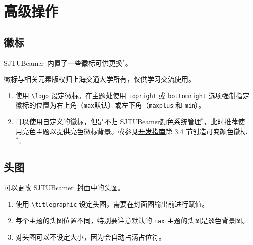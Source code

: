 \documentclass[
    UTF8,
    heading=true,
    12pt,
    a4paper
]{ctexrep}
\newenvironment{commentlist}{\begin{enumerate}\small}{\end{enumerate}}
\def\themename{\textsf{SJTUBeamer}}
\begin{document}
\part{高级操作}
\chapter{徽标}

\themename\ 内置了一些徽标可供更换$^*$。

\faInfoCircle 徽标与相关元素版权归上海交通大学所有，仅供学习交流使用。

\begin{tcbitemize}[raster rows=2, raster columns=3, raster every box/.style={center title, valign=center, halign=center,fonttitle=\ttfamily,colback=white}]
  \tcbitem[raster multicolumn=2,blankest]
  \begin{tcbitemize}[raster columns=2]
    \tcbitem[title={\textbackslash{}cnlogo}] \moveleft 0.3cm\hbox{\resizebox{!}{1cm}{\cnlogo}}
    \tcbitem[title={\textbackslash{}enlogo}] \moveleft 0.3cm\hbox{\resizebox{!}{1cm}{\enlogo}}
    \tcbitem[title={\textbackslash{}sjtubadge},height=3.5cm] \resizebox{!}{2cm}{\sjtubadge\ }
    \tcbitem[title={\textbackslash{}dlogo},height=3.5cm] \resizebox{3cm}{!}{\dlogo\ }
  \end{tcbitemize}
  \tcbitem[title={\textbackslash{}vlogo}] \resizebox{!}{4.8cm}{\vlogo\ }
\end{tcbitemize}


\begin{commentlist}
  \item 使用 \texttt{\textbackslash{}logo} 设定徽标。在主题处使用 \verb"topright" 或 \verb"bottomright" 选项强制指定徽标的位置为右上角（\verb"max"默认）或左下角（\verb"maxplus" 和 \verb"min"）。
  \item 可以使用自定义的徽标，但是不归 \themename 颜色系统管理$^*$，此时推荐使用亮色主题以提供亮色徽标背景。或参见\href{run:sjtubeamerdevguide.pdf}{开发指南}第 3.4 节创造可变颜色徽标$^*$。
\end{commentlist}

\chapter{头图}

可以更改 \themename\ 封面中的头图。


\begin{commentlist}
  \item 使用 \texttt{\textbackslash{}titlegraphic} 设定头图，需要在封面图输出前进行赋值。
  \item 每个主题的头图位置不同，特别要注意默认的 \texttt{max} 主题的头图是淡色背景图。
  \item 对头图可以不设定大小，因为会自动占满占位符。
\end{commentlist}
\end{document}
